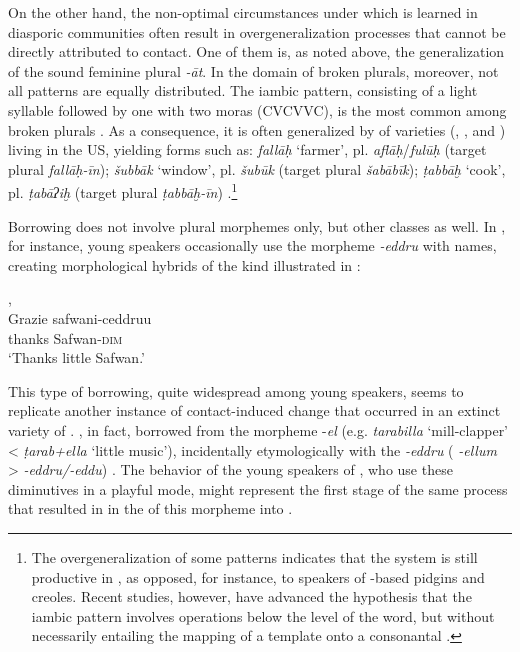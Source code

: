 \documentclass[output=paper]{langsci/langscibook}
\begin{document}
On the other hand, the non-optimal circumstances under which  is learned in diasporic communities often result in overgeneralization processes that cannot be directly attributed to contact. One of them is, as noted above, the generalization of the sound feminine plural \textit{{}-āt}. In the domain of broken plurals, moreover, not all patterns are equally distributed. The iambic pattern, consisting of a light syllable followed by one with two moras (CVCVVC), is the most common among  broken plurals \citep[857]{AlbiriniBenmamoun2014}. As a consequence, it is often generalized by  of  varieties (, ,  and ) living in the US, yielding forms such as: \textit{fallāḥ} ‘farmer’, pl. \textit{aflāḥ}/\textit{fulūḥ} (target plural \textit{fallāḥ-īn}); \textit{šubbāk} ‘window’, pl. \textit{šubūk} (target plural \textit{šabābīk}); \textit{ṭabbāḫ} ‘cook’, pl. \textit{ṭabāʔiḫ} (target plural \textit{ṭabbāḫ-īn}) \citep[865]{AlbiriniBenmamoun2014}.\footnote{The overgeneralization of some  patterns indicates that the  system is still productive in , as opposed, for instance, to speakers of -based pidgins and creoles. Recent studies, however, have advanced the hypothesis that the iambic pattern involves operations below the level of the word, but without necessarily entailing the mapping of a template onto a consonantal  \citep[112]{AlbiriniSaadah2014}.} 

Borrowing does not involve plural morphemes only, but other classes as well. In , for instance, young speakers occasionally use the   morpheme \textit{{}-eddru} with  names, creating morphological hybrids of the kind illustrated in   : 

\ea\label{ex:key:maz1}
{ ,  \citep[107]{Danna2017book}}\\
\gll Grazie safwani-ceddruu\footnotemark\\
     thanks Safwan-\textsc{dim}\\
\glt `Thanks little Safwan.'
\z

This type of borrowing, quite widespread among young speakers, seems to replicate another instance of contact-induced change that occurred in an extinct variety of .  , in fact, borrowed from  the  morpheme -\textit{el} (e.g. \textit{tarabilla} ‘mill-clapper’ < \textit{ṭarab+ella} ‘little music’), incidentally etymologically  with the  \textit{{}-eddru} ( \textit{-ellum} >  \textit{-eddru/-eddu}) \citep[60]{Andalusi2013}. The behavior of the young  speakers of , who use these  diminutives in a playful mode, might represent the first stage of the same process that resulted in in the  of this morpheme into   \citep[108]{Danna2017book}.
\end{document}
